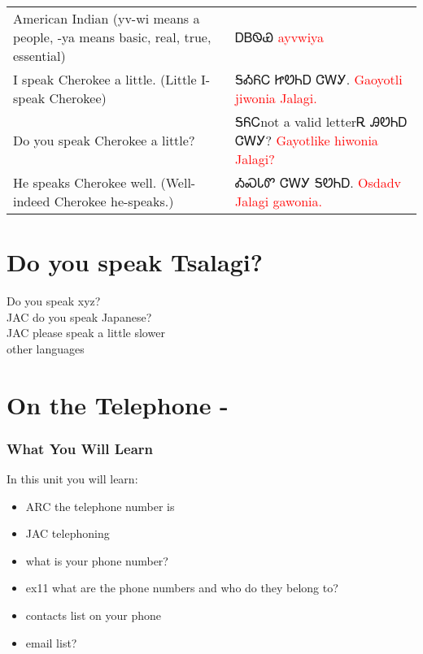 \begin{minipage}{\linewidth}
\begin{tabular}{p{5cm} p{9cm}}
American Indian (yv-wi means a people, -ya means basic, real, true, essential) & ᎠᏴᏫᏯ 
 \newline \textcolor{red}{ayvwiya}\\
I speak Cherokee a little. (Little I-speak Cherokee) & ᎦᎣᏲᏟ ᏥᏬᏂᎠ ᏣᎳᎩ. 
 \newline \textcolor{red}{Gaoyotli jiwonia Jalagi.}\\
Do you speak Cherokee a little? & ᎦᏲᏟnot a valid letterᎡ ᎯᏬᏂᎠ ᏣᎳᎩ? 
 \newline \textcolor{red}{Gayotlike hiwonia Jalagi?}\\
He speaks Cherokee well. (Well-indeed Cherokee he-speaks.) & ᎣᏍᏓᏛ ᏣᎳᎩ ᎦᏬᏂᎠ. 
 \newline \textcolor{red}{Osdadv Jalagi gawonia.}\\
\end{tabular}
\end{minipage}

\chapter*{Do you speak Tsalagi?}
Do you speak xyz?\\
JAC do you speak Japanese?\\
JAC please speak a little slower\\
other languages\\
\index{}
\chapter*{On the Telephone - }
\subsection{What You Will Learn}
In this unit you will learn:
\begin{itemize}
\item ARC the telephone number is
\item JAC telephoning
\item what is your phone number?
\item ex11 what are the phone numbers and who do they belong to?
\item contacts list on your phone
\item email list?
\end{itemize}\newpage

\newpage{}
\index{}
